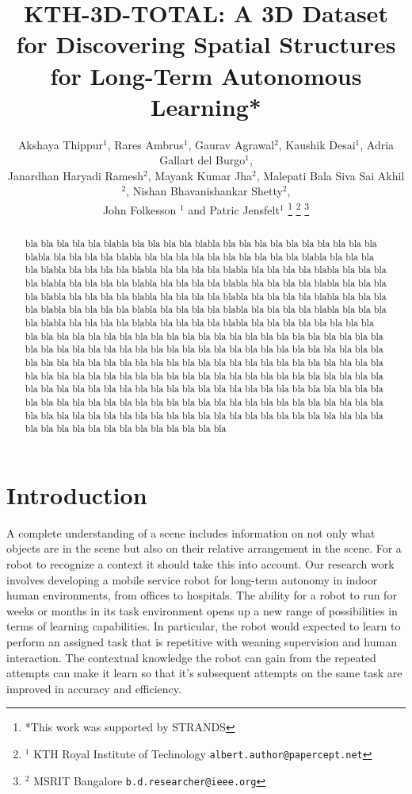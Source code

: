 \documentclass[letterpaper, 10 pt, conference]{ieeeconf}  %
\title{\LARGE \bf
KTH-3D-TOTAL: A 3D Dataset for Discovering Spatial Structures for Long-Term Autonomous
 Learning*
}
\author{Akshaya Thippur$^{1}$, Rares Ambrus$^{1}$, Gaurav Agrawal$^{2}$, Kaushik Desai$^{1}$, Adria Gallart del Burgo$^{1}$, \\Janardhan Haryadi Ramesh$^{2}$, Mayank Kumar Jha$^{2}$, Malepati Bala Siva Sai Akhil$^{2}$,  Nishan Bhavanishankar Shetty$^{2}$, \\John Folkesson $^{1}$ and Patric Jensfelt$^{1}$%
\thanks{*This work was supported by STRANDS}%
\thanks{$^{1}$ KTH Royal Institute of Technology
        {\tt\small albert.author@papercept.net}}%
\thanks{$^{2}$ MSRIT Bangalore
        {\tt\small b.d.researcher@ieee.org}}%
}
\begin{document}
\maketitle
\thispagestyle{empty}
\pagestyle{empty}

\begin{abstract}
bla bla bla bla bla blabla bla bla bla bla blabla bla bla bla bla bla
bla bla bla bla bla blabla bla bla bla bla blabla bla bla bla bla bla
bla bla bla bla bla blabla bla bla bla bla blabla bla bla bla bla blabla 
bla bla bla bla  blabla bla bla bla bla blabla bla bla bla bla blabla 
bla bla bla bla  blabla bla bla bla bla blabla bla bla bla bla blabla 
bla bla bla bla  blabla bla bla bla bla blabla bla bla bla bla blabla 
bla bla bla bla  blabla bla bla bla bla blabla bla bla bla bla blabla 
bla bla bla bla  blabla bla bla bla bla blabla bla bla bla bla blabla 
bla bla bla bla  blabla bla bla bla bla blabla bla bla bla bla bla
bla bla bla bla bla  bla bla bla bla bla bla
bla bla bla bla bla bla bla bla bla bla bla bla
bla bla bla bla bla bla bla bla bla bla bla bla
bla bla bla bla bla bla bla bla bla bla bla bla
bla bla bla bla bla bla bla bla bla bla bla bla
bla bla bla bla bla bla bla bla bla bla bla
bla bla bla bla bla bla bla bla bla bla bla bla
bla bla bla bla bla bla bla bla bla bla bla bla
bla bla bla bla bla bla bla bla bla bla bla bla
bla bla bla bla bla bla bla bla bla bla bla bla
bla bla bla bla bla  bla bla bla bla bla bla
bla bla bla bla bla bla bla bla bla bla bla bla
bla bla bla bla bla bla bla bla bla bla bla bla
bla bla bla bla bla bla bla bla bla bla bla bla
bla bla bla bla bla bla bla bla bla bla bla bla
\end{abstract}


\section{Introduction}
\label{sec:Introduction}

A complete understanding of a scene includes information on not only 
what objects are in the scene but also on their relative arrangement in
the scene. For a robot to recognize a context it should take this into
account.  Our research work involves developing
a mobile service robot for long-term autonomy in indoor human
environments, from offices to hospitals.  The ability for a robot to
run for weeks or months in its task environment opens up a new range
of possibilities in terms of learning capabilities. In particular, the
robot would expected to learn to perform an assigned task that is
repetitive with weaning supervision and human interaction. The
contextual knowledge the robot can gain from the repeated attempts can
make it learn so that it's subsequent attempts on the same task are
improved in accuracy and efficiency.
\end{document}
